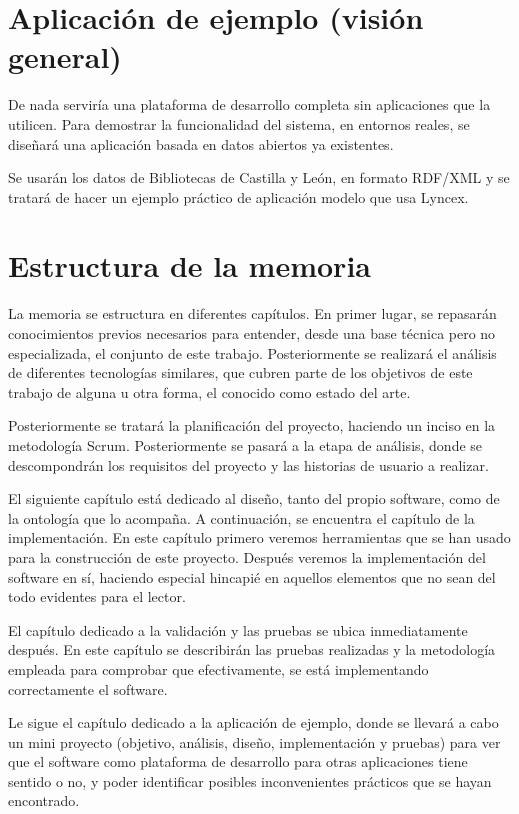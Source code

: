 \documentclass[12pt]{report} %
\begin{document}
\section{Aplicación de ejemplo (visión general)}

De nada serviría una plataforma de desarrollo completa sin aplicaciones que la utilicen. Para demostrar la funcionalidad del sistema, en entornos reales, se diseñará una aplicación basada en datos abiertos ya existentes.

Se usarán los datos de Bibliotecas de Castilla y León, en formato RDF/XML y se tratará de hacer un ejemplo práctico de aplicación modelo que usa Lyncex.

\section{Estructura de la memoria}
La memoria se estructura en diferentes capítulos. En primer lugar, se repasarán conocimientos previos necesarios para entender, desde una base técnica pero no especializada, el conjunto de este trabajo. Posteriormente se realizará el análisis de diferentes tecnologías similares, que cubren parte de los objetivos de este trabajo de alguna u otra forma, el conocido como estado del arte.

Posteriormente se tratará la planificación del proyecto, haciendo un inciso en la metodología Scrum. Posteriormente se pasará a la etapa de análisis, donde se descompondrán los requisitos del proyecto y las historias de usuario a realizar.

El siguiente capítulo está dedicado al diseño, tanto del propio software, como de la ontología que lo acompaña. A continuación, se encuentra el capítulo de la implementación. En este capítulo primero veremos herramientas que se han usado para la construcción de este proyecto. Después veremos la implementación del software en sí, haciendo especial hincapié en aquellos elementos que no sean del todo evidentes para el lector.

El capítulo dedicado a la validación y las pruebas se ubica inmediatamente después. En este capítulo se describirán las pruebas realizadas y la metodología empleada para comprobar que efectivamente, se está implementando correctamente el software.

Le sigue el capítulo dedicado a la aplicación de ejemplo, donde se llevará a cabo un mini proyecto (objetivo, análisis, diseño, implementación y pruebas) para ver que el software como plataforma de desarrollo para otras aplicaciones tiene sentido o no, y poder identificar posibles inconvenientes prácticos que se hayan encontrado.
\end{document}
